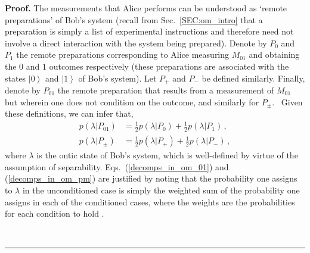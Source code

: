 \documentclass[aps,nofootinbib,12pt]{revtex4}
\newenvironment{proof}[1][Proof]{\noindent\textbf{#1.} }{\ \rule{0.5em}{0.5em}}
\begin{document}
\begin{proof}
The measurements that Alice performs can be understood as `remote
preparations' of Bob's system (recall from Sec.~\ref{SEC:om_intro}
that a preparation is simply a list of experimental instructions and
therefore need not involve a direct interaction with the system
being prepared). Denote by $P_{0}$ and $P_{1}$ the remote
preparations corresponding to Alice measuring $M_{01}$ and obtaining
the $0$ and $1$ outcomes respectively (these preparations are
associated with the states $\left\vert 0\right\rangle $ and
$\left\vert 1\right\rangle $ of Bob's system). Let $P_{+}$ and
$P_{-}$ be defined similarly. Finally, denote by $P_{01}$ the remote
preparation that results from a measurement of $M_{01}$ but wherein
one does not condition on the outcome, and similarly for $P_{\pm}.$
\ Given these definitions, we can infer that,
\begin{align}
p(\lambda|P_{01})  &
=\frac{1}{2}p(\lambda|P_{0})+\frac{1}{2}p(\lambda
|P_{1})\, ,\label{decomps_in_om_01}\\
p(\lambda|P_{\pm})  &
=\frac{1}{2}p(\lambda|P_{+})+\frac{1}{2}p(\lambda
|P_{-})\, ,\label{decomps_in_om_pm}%
\end{align}
where $\lambda$ is the ontic state of Bob's system, which is
well-defined by virtue of the assumption of separability.
Eqs.~(\ref{decomps_in_om_01}) and (\ref{decomps_in_om_pm}) are
justified by noting that the probability one assigns to $\lambda$ in
the unconditioned case is simply the weighted sum of the probability
one assigns in each of the conditioned cases, where the weights are
the probabilities for each condition to hold \cite{Spekkens_con}.


\end{proof}
\end{document}
